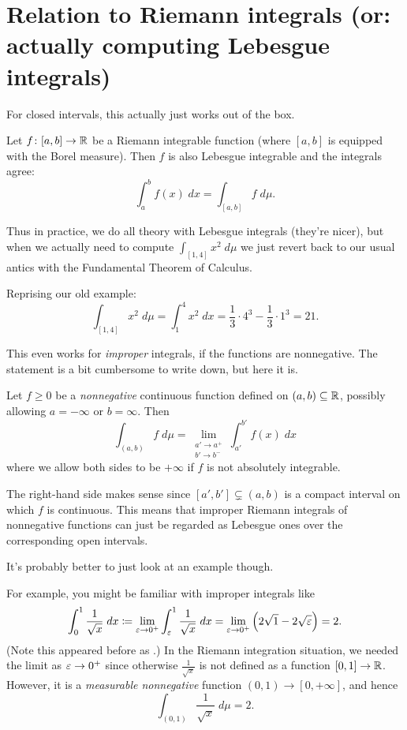 \section{Relation to Riemann integrals (or: actually computing Lebesgue integrals)}
For closed intervals, this actually just works out of the box.
\begin{theorem}
	Let $f \colon [a,b] \to \mathbb R$ be a Riemann integrable function
	(where $[a,b]$ is equipped with the Borel measure).
	Then $f$ is also Lebesgue integrable and the integrals agree:
	\[ \int_a^b f(x) \; dx = \int_{[a,b]} f \; d\mu. \]
\end{theorem}

Thus in practice, we do all theory with Lebesgue integrals (they're nicer),
but when we actually need to compute $\int_{[1,4]} x^2 \; d\mu$
we just revert back to our usual antics with the
Fundamental Theorem of Calculus.
\begin{example}
	Reprising our old example:
	\[ \int_{[1,4]} x^2 \; d\mu
		= \int_1^4 x^2 \; dx
		= \frac13 \cdot 4^3 - \frac13 \cdot 1^3 = 21.  \]
\end{example}

This even works for \emph{improper} integrals,
if the functions are nonnegative.
The statement is a bit cumbersome to write down, but here it is.
\begin{theorem}
	Let $f \ge 0$ be a \emph{nonnegative}
	continuous function defined on $(a,b) \subseteq \mathbb R$,
	possibly allowing $a = -\infty$ or $b = \infty$.
	Then
	\[ \int_{(a,b)} f \; d\mu
		= \lim_{\substack{a' \to a^+ \\ b' \to b^-}}
		\int_{a'}^{b'} f(x) \; dx \]
	where we allow both sides to be $+\infty$
	if $f$ is not absolutely integrable.
\end{theorem}
The right-hand side makes sense since $[a',b'] \subsetneq (a,b)$
is a compact interval on which $f$ is continuous.
This means that improper Riemann integrals of nonnegative
functions can just be regarded as Lebesgue ones
over the corresponding open intervals.

It's probably better to just look at an example though.
\begin{example}
	For example, you might be familiar with improper integrals like
	\[ \int_0^1 \frac{1}{\sqrt x} \; dx
		\coloneqq \lim_{\varepsilon \to 0^+}
		\int_\varepsilon^1 \frac{1}{\sqrt x} \; dx
		= \lim_{\varepsilon \to 0^+} \left( 2\sqrt{1} - 2\sqrt{\varepsilon} \right) = 2.
	\]
	(Note this appeared before as .)
	In the Riemann integration situation, we needed the limit as $\varepsilon \to 0^+$
	since otherwise $\frac{1}{\sqrt x}$ is not defined as a function $[0,1] \to \mathbb R$.
	However, it is a \emph{measurable nonnegative}
	function $(0,1) \to [0,+\infty]$,
	and hence
	\[ \int_{(0,1)} \frac{1}{\sqrt x} \; d\mu = 2. \]
\end{example}


